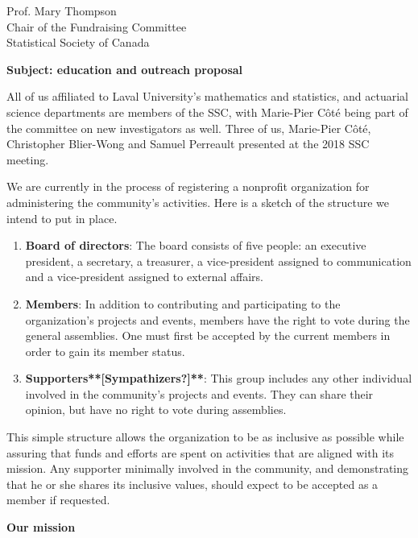 \documentclass[11pt, a4paper]{letter} %
\begin{document}
\begin{letter}{
	Prof. Mary Thompson\\
	Chair of the Fundraising Committee\\
	Statistical Society of Canada
	
	\bigskip
	\textbf{Subject: education and outreach proposal}%
}
\noindent All of us affiliated to Laval University's mathematics and statistics, and actuarial science departments are members of the SSC, with Marie-Pier Côté being part of the committee on new investigators as well. Three of us, Marie-Pier Côté, Christopher Blier-Wong and Samuel Perreault presented at the 2018 SSC meeting.


We are currently in the process of registering a nonprofit organization for administering the community's activities. Here is a sketch of the structure we intend to put in place.

\begin{enumerate}
	\item[] \textbf{Board of directors}: The board consists of five people: an executive president, a secretary, a treasurer, a vice-president assigned to communication and a vice-president assigned to external affairs.
	\item[] \textbf{Members}: In addition to contributing and participating to the organization's projects and events, members have the right to vote during the general assemblies. One must first be accepted by the current members in order to gain its member status.
	\item[] \textbf{Supporters**[Sympathizers?]**}: This group includes any other individual involved in the community's projects and events. They can share their opinion, but have no right to vote during assemblies.
\end{enumerate}

This simple structure allows the organization to be as inclusive as possible while assuring that funds and efforts are spent on activities that are aligned with its mission. Any supporter minimally involved in the community, and demonstrating that he or she shares its inclusive values, should expect to be accepted as a member if requested.

\bigskip
\noindent \textbf{Our mission}


\end{letter}
\end{document}
